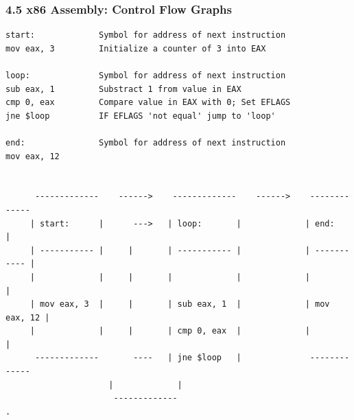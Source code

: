 \begin{frame}[fragile]
  \frametitle{4.5 x86 Assembly: Control Flow Graphs}
  \begin{lstlisting}[basicstyle=\tiny]
start:             Symbol for address of next instruction
mov eax, 3         Initialize a counter of 3 into EAX

loop:              Symbol for address of next instruction
sub eax, 1         Substract 1 from value in EAX
cmp 0, eax         Compare value in EAX with 0; Set EFLAGS
jne $loop          IF EFLAGS 'not equal' jump to 'loop'

end:               Symbol for address of next instruction
mov eax, 12


      -------------    ------>    -------------    ------>    ------------- 
     | start:      |      --->   | loop:       |             | end:        |
     | ----------- |     |       | ----------- |             | ----------- |
     |             |     |       |             |             |             |
     | mov eax, 3  |     |       | sub eax, 1  |             | mov eax, 12 |
     |             |     |       | cmp 0, eax  |             |             |
      -------------       ----   | jne $loop   |              -------------
			         |             | 
			          ------------- 
.
  \end{lstlisting}
\end{frame}







